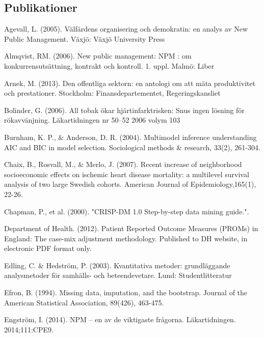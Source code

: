 \subsection{Publikationer}

Agevall, L. (2005). Välfärdens organisering och demokratin: en analys av New Public Management. Växjö: Växjö University Press\newline

Almqvist, RM. (2006). New public management: NPM : om konkurrensutsättning, kontrakt och kontroll. 1. uppl. Malmö: Liber		\newline
	
Arnek, M. (2013). Den offentliga sektorn: en antologi om att mäta produktivitet och prestationer. Stockholm: Finansdepartementet, Regeringskansliet\newline

Bolinder, G. (2006). All tobak ökar hjärtinfarktrisken: Snus ingen lösning för rökavvänjning. Läkartidningen nr 50–52 2006 volym 103\newline

Burnham, K. P., \& Anderson, D. R. (2004). Multimodel inference understanding AIC and BIC in model selection. Sociological methods \& research, 33(2), 261-304.\newline

Chaix, B., Rosvall, M., \& Merlo, J. (2007). Recent increase of neighborhood socioeconomic effects on ischemic heart disease mortality: a multilevel survival analysis of two large Swedish cohorts. American Journal of Epidemiology,165(1), 22-26.\newline

Chapman, P., et al. (2000). "CRISP-DM 1.0 Step-by-step data mining guide.".\newline

Department of Health. (2012). Patient Reported Outcome Measures (PROMs) in England: The case-mix adjustment methodology. Published to DH website, in electronic PDF format only.\newline

Edling, C. \& Hedström, P. (2003). Kvantitativa metoder: grundläggande analysmetoder för samhälls- och beteendevetare. Lund: Studentlitteratur\newline

Efron, B. (1994). Missing data, imputation, and the bootstrap. Journal of the American Statistical Association, 89(426), 463-475.\newline

Engström, I. (2014). NPM – en av de viktigaste frågorna. Läkartidningen. 2014;111:CPE9.\newline

